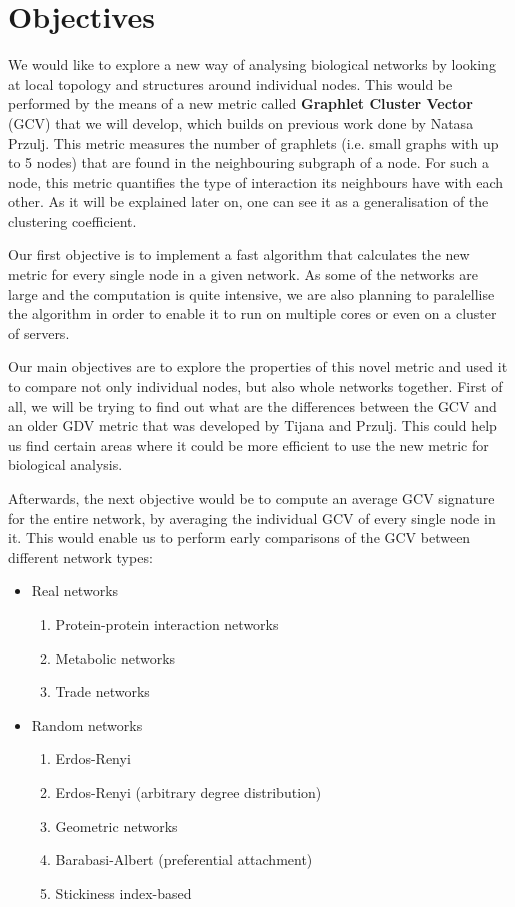 \section{Objectives}

We would like to explore a new way of analysing biological networks by
looking at local topology and structures around individual nodes. This
would be performed by the means of a new metric called \textbf{Graphlet Cluster
Vector} (GCV) that we will develop, which builds on previous work done by Natasa
Przulj\cite{prvzulj2007biological}. This metric measures the number of
graphlets (i.e. small graphs with up to 5 nodes) that are found in the
neighbouring subgraph of a node. For such a node, this metric quantifies the
type of interaction its neighbours have with each other. As it will be 
explained later on, one can see it as a generalisation of the clustering coefficient.

Our first objective is to implement a fast algorithm that calculates the new
metric for every single node in a given network. As some of the networks are
large and the computation is quite intensive, we are also planning to paralellise
the algorithm in order to enable it to run on multiple cores or even on a cluster of
servers.

Our main objectives are to explore the properties of this novel metric and
used it to compare not only individual nodes, but also whole networks together.
First of all, we will be trying to find out what are the differences between the
GCV and an older GDV metric that was developed by Tijana and
Przulj\cite{milenkoviae2008uncovering}. This could help us find certain areas
where it could be more efficient to use the new metric for biological analysis. 

Afterwards, the next objective would be to compute an average GCV signature for
the entire network, by averaging the individual GCV of every single node in it.
This would enable us to perform early comparisons of the GCV between different
network types: 
\begin{itemize}
 \item Real networks
 \begin{enumerate}
    \item Protein-protein interaction networks
    \item Metabolic networks
    \item Trade networks
  \end{enumerate}
 \item Random networks
 \begin{enumerate}
    \item Erdos-Renyi\cite{erdHos1959random}
    \item Erdos-Renyi (arbitrary degree distribution)
    \item Geometric networks\cite{penrose2003random}
    \item Barabasi-Albert (preferential attachment)\cite{barabasi1999emergence}
    \item Stickiness index-based\cite{prvzulj2006modelling}
  \end{enumerate}
\end{itemize}

